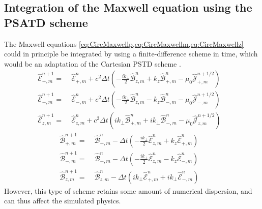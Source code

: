 \documentclass[1p,times]{elsarticle}
\newcommand{\tB}[2]{\spectral{B}_{#1,m}^{#2}}
\newcommand{\tE}[2]{\spectral{E}_{#1,m}^{#2}}
\newcommand{\tj}[2]{\spectral{J}_{#1,m}^{#2}}
\newcommand{\spectral}[1]{\hat{\mathcal{#1}}}
\begin{document}
\subsection{Integration of the Maxwell equation using the PSATD scheme}
\label{sec:FieldIntegration}

The Maxwell equations
\cref{eq:CircMaxwellp,eq:CircMaxwellm,eq:CircMaxwellz} could in
principle be integrated by using a finite-difference scheme in time, 
which would be an adaptation of the Cartesian PSTD scheme \cite{Liu}.
\begin{subequations}
\begin{align}
\tE{+}{n+1} = \; & \tE{+}{n} + 
c^2\Delta t\left(-\frac{ik_\perp }{2} \tB{z}{n} + k_z\tB{+}{n}
- \mu_0 \tj{+}{n+1/2} \right) & \\
\tE{-}{n+1} =\; & \tE{-}{n} +
c^2\Delta t\left(- \frac{ik_\perp }{2} \tB{z}{n} - k_z\tB{-}{n}
- \mu_0 \tj{-}{n+1/2} \right) &\\
\tE{z}{n+1} =\; & \tE{z}{n} + 
c^2\Delta t\left(ik_\perp \tB{+}{n} + ik_\perp \tB{-}{n}
- \mu_0 \tj{z}{n+1/2} \right)  &
\end{align}
\end{subequations}
\begin{subequations}
\begin{align}
\tB{+}{n+1} = \; & \tB{+}{n} - 
\Delta t\left(-\frac{ik_\perp }{2} \tE{z}{n} + k_z\tE{+}{n}
\right) & \\
\tB{-}{n+1} =\; & \tB{-}{n} - 
\Delta t\left(- \frac{ik_\perp }{2} \tE{z}{n} - k_z\tE{-}{n}
\right) &\\
\tB{z}{n+1} =\; & \tB{z}{n} - 
\Delta t\left(ik_\perp \tE{+}{n} + ik_\perp \tE{-}{n}
\right) &
\end{align}
\end{subequations}
However, this type of scheme retains some amount of numerical dispersion, and can
thus affect the simulated physics.
\end{document}
